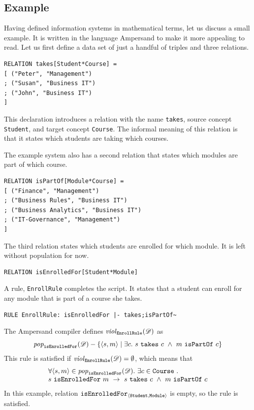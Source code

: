 \documentclass[runningheads]{llncs}
\newcommand{\id}[1]{\text{\it #1\/}}
\newcommand{\popF}[1]{\id{pop}_{#1}}
\newcommand{\pop}[2]{\popF{#1}(#2)}
\newcommand{\viol}[2]{\violC{#1}(#2)}
\newcommand{\violC}[1]{\id{viol}_{#1}}
\newcommand{\declare}[3]{\id{#1}_{\pair{#2}{#3}}}
\newcommand{\pair}[2]{\langle{#1},{#2}\rangle}
\newcommand{\dataset}{\mathscr{D}}
\begin{document}
\subsection{Example}
\label{sct:Example existing IS}
   Having defined information systems in mathematical terms, let us discuss a small example.
   It is written in the language Ampersand to make it more appealing to read.
   Let us first define a data set of just a handful of triples and three relations.
\begin{verbatim}
RELATION takes[Student*Course] =
[ ("Peter", "Management")
; ("Susan", "Business IT")
; ("John", "Business IT")
]
\end{verbatim}
   This declaration introduces a relation with the name \verb#takes#,
   source concept \verb#Student#, and
   target concept \verb#Course#.
   The informal meaning of this relation is that it states which students are taking which courses.

   The example system also has a second relation that states which modules are part of which course.
\begin{verbatim}
RELATION isPartOf[Module*Course] =
[ ("Finance", "Management")
; ("Business Rules", "Business IT")
; ("Business Analytics", "Business IT")
; ("IT-Governance", "Management")
]
\end{verbatim}
   The third relation states which students are enrolled for which module.
   It is left without population for now.
\begin{verbatim}
RELATION isEnrolledFor[Student*Module]
\end{verbatim}

   A rule, {\tt EnrollRule} completes the script.
   It states that a student can enroll for any module that is part of a course she takes.
\begin{verbatim}
RULE EnrollRule: isEnrolledFor |- takes;isPartOf~
\end{verbatim}
   The Ampersand compiler defines $\viol{\tt EnrollRule}{\dataset}$ as
\begin{equation}
   \pop{\tt isEnrolledFor}{\dataset}-\{\pair{s}{m} \mid\exists c.~s\ \text{\tt takes}\ c\ \wedge\ m\ \text{\tt isPartOf}\ c\}
\end{equation}
   This rule is satisfied if $\viol{\tt EnrollRule}{\dataset}=\emptyset$, which means that
\begin{equation}
   \begin{array}{l}
   \forall \pair{s}{m}\in\pop{\tt isEnrolledFor}{\dataset}.~ \exists c\in\text{\tt Course}~.\\
   s\ \text{\tt isEnrolledFor}\ m\ \rightarrow\ s\ \text{\tt takes}\ c\ \wedge\ m\ \text{\tt isPartOf}\ c
   \end{array}
\label{eqn:example isEnrolledFor}
\end{equation}
   In this example, relation $\declare{\tt isEnrolledFor}{\tt Student}{\tt Module}$ is empty, so the rule is satisfied.
\end{document}
